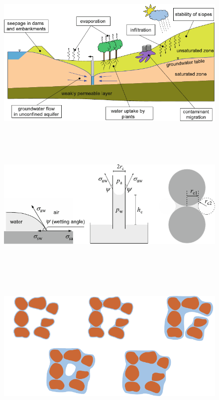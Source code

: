 \begin{frame}
	\frametitle{\secname}
	\begin{figure}[ht!]
		\centering
		\includegraphics[height=6.8cm]{contamination}
	\end{figure}
\end{frame}

\begin{frame}
	\frametitle{\secname}
	\begin{figure}[ht!]
		\centering
		\includegraphics[height=6.8cm]{capillar_preassure}
	\end{figure}
\end{frame}

\begin{frame}
	\frametitle{\secname}
	\begin{figure}[ht!]
		\centering
		\includegraphics[height=6.8cm]{wetness}
	\end{figure}
\end{frame}